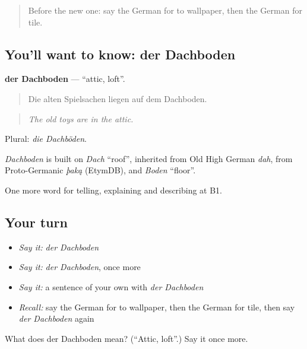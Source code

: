 \begin{quote}
Before the new one: say the German for to wallpaper, then the German for tile.
\end{quote}

\subsection*{You'll want to know: der Dachboden}
\textbf{der Dachboden} — \textquotedblleft{}attic, loft\textquotedblright{}.

\begin{quote}
Die alten Spielsachen liegen auf dem Dachboden.
\end{quote}

\begin{quote}
\emph{The old toys are in the attic.}
\end{quote}

Plural: \emph{die Dachböden}.

\begin{cousinweb}
\emph{Dachboden} is built on \emph{Dach} \textquotedblleft{}roof\textquotedblright{}, inherited from Old High German \emph{dah}, from Proto-Germanic \emph{þaką} (EtymDB), and \emph{Boden} \textquotedblleft{}floor\textquotedblright{}.
\end{cousinweb}

\begin{grammarlens}[title={What you've built}]
One more word for telling, explaining and describing at B1.
\end{grammarlens}

\subsection*{Your turn}
\begin{itemize}
\raggedright
  \item \emph{Say it:} \emph{der Dachboden}
  \item \emph{Say it:} \emph{der Dachboden}, once more
  \item \emph{Say it:} a sentence of your own with \emph{der Dachboden}
  \item \emph{Recall:} say the German for to wallpaper, then the German for tile, then say \emph{der Dachboden} again
\end{itemize}

\begin{tcolorbox}[breakable,colback=teal!4,colframe=teal!35!black,title={Before you move on}]
What does der Dachboden mean? (\textquotedblleft{}Attic, loft\textquotedblright{}.) Say it once more.
\end{tcolorbox}
